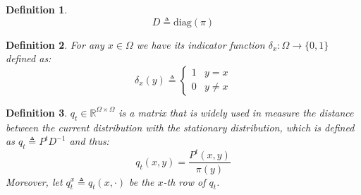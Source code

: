 \documentclass[utf8]{article}
\newtheorem{define}{Definition}[section]
\begin{document}
\begin{define}
  \[D \triangleq \mathrm{diag}(\pi)\]
\end{define}

\begin{define}
  For any $x\in\Omega$ we have its indicator function $\delta_x:\Omega \to \{0,1\}$ defined as:
  \[\delta_x (y) \triangleq \left\{
      \begin{array}{ll}
        1 & y = x \\
        0 & y\not= x
      \end{array}
    \right.\]
\end{define}

\begin{define}
  $q_t \in \mathbb{R}^{\Omega\times\Omega}$ is a matrix that is widely used in measure the distance between the current distribution with the stationary distribution, which is defined as $q_t \triangleq P^tD^{-1}$ and thus:
  \[q_t(x, y) = \frac{P^t(x,y)}{\pi(y)}\]
  Moreover, let $q_t^x \triangleq q_t(x, \cdot)$ be the $x$-th row of $q_t$.
\end{define}
\end{document}
